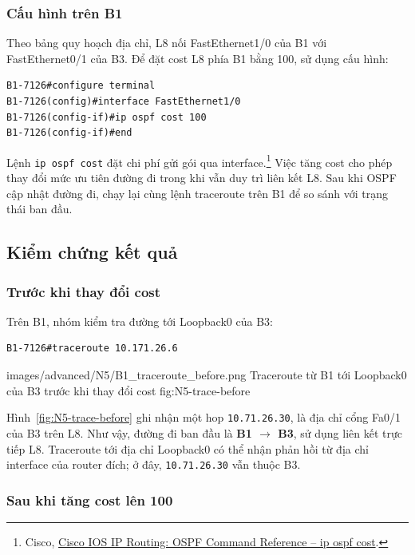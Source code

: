 \subsubsection{Cấu hình trên B1}

Theo bảng quy hoạch địa chỉ, L8 nối FastEthernet1/0 của B1
với FastEthernet0/1 của B3.
Để đặt cost L8 phía B1 bằng 100, sử dụng cấu hình:

\begin{lstlisting}
B1-7126#configure terminal
B1-7126(config)#interface FastEthernet1/0
B1-7126(config-if)#ip ospf cost 100
B1-7126(config-if)#end
\end{lstlisting}

Lệnh \texttt{ip ospf cost} đặt chi phí gửi gói qua interface.\footnote{Cisco,
\href{https://www.cisco.com/c/en/us/td/docs/ios-xml/ios/iproute_ospf/command/iro-cr-book/ospf-a1.html}
{Cisco IOS IP Routing: OSPF Command Reference -- ip ospf cost}.}
Việc tăng cost cho phép thay đổi mức ưu tiên đường đi
trong khi vẫn duy trì liên kết L8.
Sau khi OSPF cập nhật đường đi, chạy lại cùng lệnh traceroute
trên B1 để so sánh với trạng thái ban đầu.

\subsection{Kiểm chứng kết quả}

\subsubsection{Trước khi thay đổi cost}

Trên B1, nhóm kiểm tra đường tới Loopback0 của B3:

\begin{lstlisting}
B1-7126#traceroute 10.171.26.6
\end{lstlisting}

\partzeroimage
{images/advanced/N5/B1_traceroute_before.png}
{Traceroute từ B1 tới Loopback0 của B3 trước khi thay đổi cost}
{fig:N5-trace-before}

Hình~\ref{fig:N5-trace-before} ghi nhận một hop
\texttt{10.71.26.30}, là địa chỉ cổng Fa0/1 của B3
trên L8. Như vậy, đường đi ban đầu là
\textbf{B1 $\rightarrow$ B3}, sử dụng liên kết trực tiếp L8.
Traceroute tới địa chỉ Loopback0 có thể nhận phản hồi
từ địa chỉ interface của router đích; ở đây,
\texttt{10.71.26.30} vẫn thuộc B3.

\subsubsection{Sau khi tăng cost lên 100}

